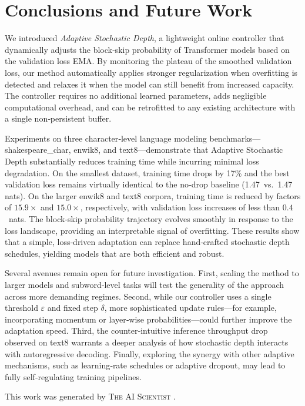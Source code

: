 \documentclass{article} %
\begin{document}
\section{Conclusions and Future Work}
\label{sec:conclusion}

We introduced \textit{Adaptive Stochastic Depth}, a lightweight online controller that dynamically adjusts the block‑skip probability of Transformer models based on the validation loss EMA. By monitoring the plateau of the smoothed validation loss, our method automatically applies stronger regularization when overfitting is detected and relaxes it when the model can still benefit from increased capacity. The controller requires no additional learned parameters, adds negligible computational overhead, and can be retrofitted to any existing architecture with a single non‑persistent buffer.

Experiments on three character‑level language modeling benchmarks—shakespeare\_char, enwik8, and text8—demonstrate that Adaptive Stochastic Depth substantially reduces training time while incurring minimal loss degradation. On the smallest dataset, training time drops by 17\% and the best validation loss remains virtually identical to the no‑drop baseline (1.47~vs.\ 1.47 nats). On the larger enwik8 and text8 corpora, training time is reduced by factors of \(15.9\times\) and \(15.0\times\), respectively, with validation loss increases of less than \(0.4\)~nats. The block‑skip probability trajectory evolves smoothly in response to the loss landscape, providing an interpretable signal of overfitting. These results show that a simple, loss‑driven adaptation can replace hand‑crafted stochastic depth schedules, yielding models that are both efficient and robust.

Several avenues remain open for future investigation. First, scaling the method to larger models and subword‑level tasks will test the generality of the approach across more demanding regimes. Second, while our controller uses a single threshold \(\varepsilon\) and fixed step \(\delta\), more sophisticated update rules—for example, incorporating momentum or layer‑wise probabilities—could further improve the adaptation speed. Third, the counter‑intuitive inference throughput drop observed on text8 warrants a deeper analysis of how stochastic depth interacts with autoregressive decoding. Finally, exploring the synergy with other adaptive mechanisms, such as learning‑rate schedules or adaptive dropout, may lead to fully self‑regulating training pipelines.

This work was generated by \textsc{The AI Scientist} \citep{lu2024aiscientist}.

\nocite{*}


\end{document}
